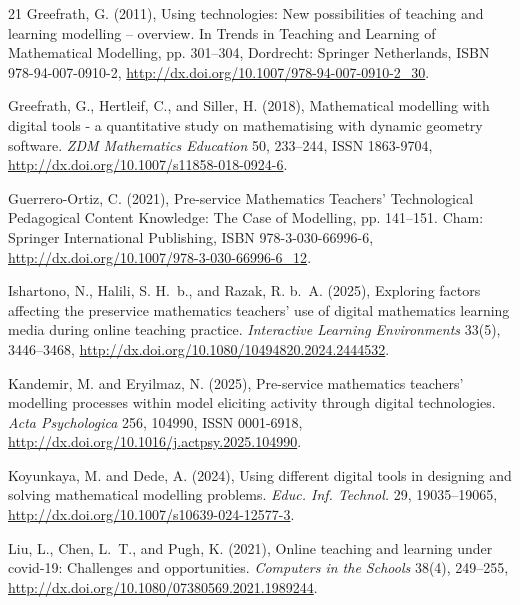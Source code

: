 \documentclass[a4paper,12pt]{article}
\begin{document}
\begin{thebibliography}{21}
Greefrath, G. (2011), Using technologies: New possibilities of teaching and
  learning modelling -- overview. In Trends in Teaching and Learning of
  Mathematical Modelling, pp. 301--304, Dordrecht: Springer Netherlands, ISBN
  978-94-007-0910-2,
  \urlprefix\url{http://dx.doi.org/10.1007/978-94-007-0910-2_30}.

Greefrath, G., Hertleif, C., and Siller, H. (2018), Mathematical modelling with
  digital tools - a quantitative study on mathematising with dynamic geometry
  software. \emph{ZDM Mathematics Education} 50, 233--244, ISSN 1863-9704,
  \urlprefix\url{http://dx.doi.org/10.1007/s11858-018-0924-6}.

Guerrero-Ortiz, C. (2021), Pre-service Mathematics Teachers' Technological
  Pedagogical Content Knowledge: The Case of Modelling, pp. 141--151. Cham:
  Springer International Publishing, ISBN 978-3-030-66996-6,
  \urlprefix\url{http://dx.doi.org/10.1007/978-3-030-66996-6_12}.

Ishartono, N., Halili, S. H.~b., and Razak, R. b.~A. (2025), Exploring factors
  affecting the preservice mathematics teachers' use of digital mathematics
  learning media during online teaching practice. \emph{Interactive Learning
  Environments} 33(5), 3446--3468,
  \urlprefix\url{http://dx.doi.org/10.1080/10494820.2024.2444532}.

Kandemir, M. and Eryilmaz, N. (2025), Pre-service mathematics teachers'
  modelling processes within model eliciting activity through digital
  technologies. \emph{Acta Psychologica} 256, 104990, ISSN 0001-6918,
  \urlprefix\url{http://dx.doi.org/10.1016/j.actpsy.2025.104990}.

Koyunkaya, M. and Dede, A. (2024), Using different digital tools in designing
  and solving mathematical modelling problems. \emph{Educ. Inf. Technol.} 29,
  19035--19065, \urlprefix\url{http://dx.doi.org/10.1007/s10639-024-12577-3}.

Liu, L., Chen, L.~T., and Pugh, K. (2021), Online teaching and learning under
  covid-19: Challenges and opportunities. \emph{Computers in the Schools}
  38(4), 249--255,
  \urlprefix\url{http://dx.doi.org/10.1080/07380569.2021.1989244}.


\end{thebibliography}
\end{document}
